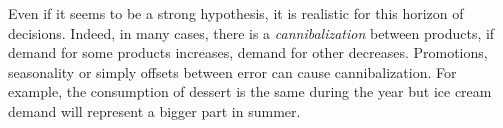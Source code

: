 Even if it seems to be a strong hypothesis, it is realistic for this horizon of decisions.
Indeed, in many cases, there is a \emph{cannibalization} between products, \ie if demand for some products increases, demand for other decreases.
Promotions, seasonality or simply offsets between error can cause cannibalization.
For example, the consumption of dessert is the same during the year but ice cream demand will represent a bigger part in summer.













